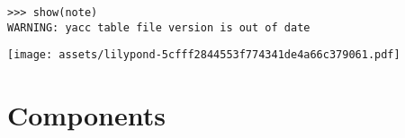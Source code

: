 \begin{comment}
<abjad>
show(note)
</abjad>
\end{comment}

\begin{abjadbookoutput}
\begin{singlespacing}
\vspace{-0.5\baselineskip}
\begin{verbatim}
>>> show(note)
WARNING: yacc table file version is out of date
\end{verbatim}
\noindent\texttt{[image: assets/lilypond-5cfff2844553f774341de4a66c379061.pdf]}
\end{singlespacing}
\end{abjadbookoutput}

\section{Components}
\label{sec:components}

\begin{comment}
-   Every component may be named.
-   components, leaves, containers (and contexts)
-   components are formattable and illustrable
-   components are mutable, while indicators are generally not
    -   likewise, durations and pitches are immutable

-   count-time components
    -   note, chord, rest, skip, container, tuplet, measure
-   non-count-time (contexts)
    -   voice, staff, staff group, score

-   leaves do not contain anything else
    -   chord do *not* contain notes
    -   chords and notes contain note heads
    -   chord and notes share a single stem
    -   this must be disambiguated from note columns

-   all containers derive their duration from their contents (with some
    exceptions, but even there a mismatch is an error)
-   written duration, prolated duration, pre-prolated duration, contents
    duration

-   One, and only one, parent per component. They *cannot* be in more than one
    container. This is both confusing, and liable to cause reference problems.
-   score hierarchy is not fixed: any node is the root, if it has no parent

-   contexts are assumed to last from the beginning to the end of the total
    timespan of the score, but in practice they may be intermittent
-   contexts may be named, allowing concatenation

-   Leaves reside at the "bottom" of the score hierarchy.

Work aspects of this into appropriate sections

-   inspect_()
-   not *inspect()*, as that would cause a name conflict with Python's inspect
    module
-   inspect(...).get_parentage()
-   inspect_(...).get_duration()
    -   in_seconds=True
-   inspect_(...).get_timespan()
    -   in_seconds=True
\end{comment}

